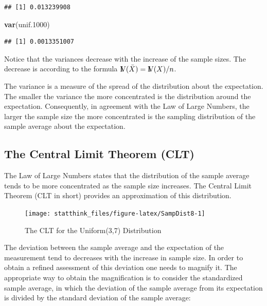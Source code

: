 \documentclass[]{krantz}
\makeatletter
\newenvironment{Shaded}{\begin{snugshade}}{\end{snugshade}}
\newcommand{\KeywordTok}[1]{\textcolor[rgb]{0.13,0.29,0.53}{\textbf{#1}}}
\newcommand{\DecValTok}[1]{\textcolor[rgb]{0.00,0.00,0.81}{#1}}
\newcommand{\NormalTok}[1]{#1}
\newcommand{\Var}{{\rm I\kern-.3em V}}
\newenvironment{kframe}{%
\medskip{}
\setlength{\fboxsep}{.8em}
 \def\at@end@of@kframe{}%
 \ifinner\ifhmode%
  \def\at@end@of@kframe{\end{minipage}}%
  \begin{minipage}{\columnwidth}%
 \fi\fi%
 \def\FrameCommand##1{\hskip\@totalleftmargin \hskip-\fboxsep
 \colorbox{shadecolor}{##1}\hskip-\fboxsep
     \hskip-\linewidth \hskip-\@totalleftmargin \hskip\columnwidth}%
 \MakeFramed {\advance\hsize-\width
   \@totalleftmargin\z@ \linewidth\hsize
   \@setminipage}}%
 {\par\unskip\endMakeFramed%
 \at@end@of@kframe}
\renewenvironment{Shaded}{\begin{kframe}}{\end{kframe}}
\theoremstyle{definition}
\theoremstyle{definition}
\theoremstyle{definition}
\theoremstyle{remark}
\makeatother
\begin{document}
\begin{verbatim}
## [1] 0.013239908
\end{verbatim}

\begin{Shaded}
\begin{Highlighting}[]
\KeywordTok{var}\NormalTok{(unif.}\DecValTok{1000}\NormalTok{)}
\end{Highlighting}
\end{Shaded}

\begin{verbatim}
## [1] 0.0013351007
\end{verbatim}

Notice that the variances decrease with the increase of the sample
sizes. The decrease is according to the formula
\(\Var(\bar X) = \Var(X)/n\).

The variance is a measure of the spread of the distribution about the
expectation. The smaller the variance the more concentrated is the
distribution around the expectation. Consequently, in agreement with the
Law of Large Numbers, the larger the sample size the more concentrated
is the sampling distribution of the sample average about the
expectation.

\subsection{The Central Limit Theorem
(CLT)}\label{the-central-limit-theorem-clt}

The Law of Large Numbers states that the distribution of the sample
average tends to be more concentrated as the sample size increases. The
Central Limit Theorem (CLT in short) provides an approximation of this
distribution.

\begin{figure}

{\centering \texttt{[image: statthink\_files/figure-latex/SampDist8-1]} 

}

\caption{The CLT for the Uniform(3,7) Distribution}\label{fig:SampDist8}
\end{figure}

The deviation between the sample average and the expectation of the
measurement tend to decreases with the increase in sample size. In order
to obtain a refined assessment of this deviation one needs to magnify
it. The appropriate way to obtain the magnification is to consider the
standardized sample average, in which the deviation of the sample
average from its expectation is divided by the standard deviation of the
sample average:
\end{document}
